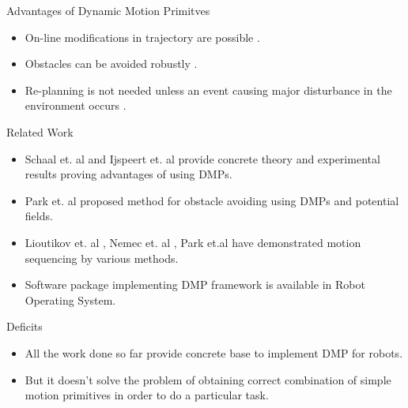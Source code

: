 \documentclass{beamer}
\begin{document}
\begin{frame}{Advantages of Dynamic Motion Primitves}
\begin{itemize}

\item On-line modifications in trajectory are possible \cite{schaal2006dynamic}. 
\item Obstacles can be avoided robustly \cite{park2008movement}. 
\item Re-planning is not needed unless an event causing major disturbance in the environment occurs \cite{park2008movement}.
\end{itemize}
\end{frame}

\begin{frame}{Related Work}
\begin{itemize}
\item Schaal et. al\cite{schaal2006dynamic} and Ijspeert et. al\cite{ijspeert2003learning,ijspeert2013dynamical} provide concrete theory and experimental results proving advantages of using DMPs.
\item Park et. al\cite{park2008movement} proposed method for obstacle avoiding using DMPs and potential fields. 
\item Lioutikov et. al , Nemec et. al , Park et.al have demonstrated motion sequencing by various methods. \cite{lioutikov2016learning,nemec2012action,park2008movement}
\item Software package implementing DMP framework is available in Robot Operating System.  
\end{itemize}
\end{frame}

\begin{frame}{Deficits}
\begin{itemize}
\item All the work done so far provide concrete base to implement DMP for robots. 
\item But it doesn't solve the problem of obtaining correct combination of simple motion primitives in order to do a particular task.  
\end{itemize}
\end{frame}

{}

\end{document}
